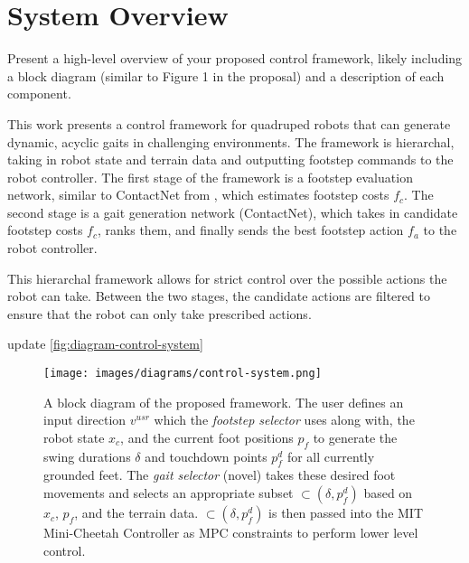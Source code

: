 \section{System Overview}

\begin{outline}
  Present a high-level overview of your proposed control framework,
  likely including a block diagram (similar to Figure 1 in the
  proposal) and a description of each component.
\end{outline}

This work presents a control framework for quadruped robots that
can generate dynamic, acyclic gaits in challenging environments. The
framework is hierarchal, taking in robot state and terrain data and
outputting footstep commands to the robot controller. The first stage of
the framework is a footstep evaluation network, similar to ContactNet
from \cite{bratta_contactnet_2024}, which estimates footstep costs $f_c$.
The second stage is a gait generation
network (ContactNet), which takes in candidate footstep costs $f_c$,
ranks them, and finally sends the best footstep action $f_a$ to the
robot controller.

This hierarchal framework allows for strict control over the possible
actions the robot can take. Between the two stages, the candidate
actions are filtered to ensure that the robot can only take prescribed
actions.

\begin{todo}
  update \autoref{fig:diagram-control-system}
\end{todo}

\begin{figure}[H]
  \centering
  \texttt{[image: images/diagrams/control-system.png]}
  \caption{A block diagram of the proposed framework. The user
    defines an input direction $v^{usr}$ which the \textit{footstep
    selector} \cite{bratta_contactnet_2024} uses along with, the robot
    state $x_c$, and the current foot positions $p_f$ to generate the
    swing durations $\delta$ and touchdown points $p_f^d$ for all
    currently grounded feet. The \textit{gait selector} (novel) takes
    these desired foot movements and selects an appropriate subset
    $\subset(\delta,p_f^d)$ based on $x_c$, $p_f$, and the terrain
    data. $\subset(\delta,p_f^d)$ is then passed into the MIT
  Mini-Cheetah Controller as MPC constraints to perform lower level control.}
  \label{fig:diagram-control-system}
\end{figure}
